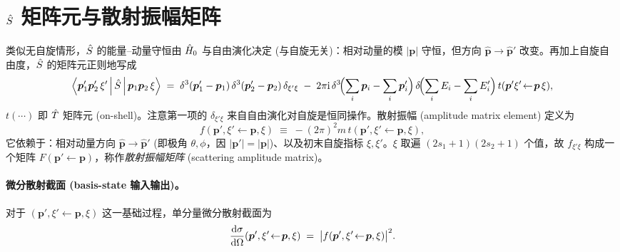 \section{$\hat{S}$ 矩阵元与散射振幅矩阵}\label{sec:Smat-amp-matrix}

类似无自旋情形，$\hat{S}$ 的能量--动量守恒由 $\hat{H}_0$ 与自由演化决定 (与自旋无关)：相对动量的模 $|\bm p|$ 守恒，但方向 $\hat{\bm p}\to\hat{\bm p}'$ 改变。再加上自旋自由度，$\hat{S}$ 的矩阵元正则地写成
\begin{equation}
  \left\langle \bm p_1'\bm p_2'\,\xi' \,\middle|\, \hat{S} \,\middle|\, \bm p_1\bm p_2\,\xi \right\rangle
  \;=\;\delta^3(\bm p_1'-\bm p_1)\,\delta^3(\bm p_2'-\bm p_2)\,\delta_{\xi'\xi}
  \;-\;2\pi\mathrm{i}\,\delta^3\!\Bigl(\sum_i\bm p_i-\sum_i\bm p_i'\Bigr)\,\delta\!\Bigl(\sum_i E_i-\sum_i E_i'\Bigr)\,t(\bm p'\xi'\!\leftarrow\!\bm p\,\xi),
  \label{eq:Smat-element-spin}
\end{equation}
$t(\cdots)$ 即 $\hat{T}$ 矩阵元 (on-shell)。注意第一项的 $\delta_{\xi'\xi}$ 来自自由演化对自旋是恒同操作。散射振幅 (amplitude matrix element) 定义为
\begin{equation}
  f(\bm p',\xi'\!\leftarrow\!\bm p,\xi)
  \;\equiv\;-(2\pi)^2 m\, t(\bm p',\xi'\!\leftarrow\!\bm p,\xi),
  \label{eq:f-from-T}
\end{equation}
它依赖于：相对动量方向 $\hat{\bm p}\to\hat{\bm p}'$ (即极角 $\theta,\phi$，因 $|\bm p'|=|\bm p|$)、以及初末自旋指标 $\xi,\xi'$。$\xi$ 取遍 $(2s_1+1)(2s_2+1)$ 个值，故 $f_{\xi'\xi}$ 构成一个矩阵 $F(\bm p'\!\leftarrow\!\bm p)$，称作\emph{散射振幅矩阵} (scattering amplitude matrix)。

\paragraph{微分散射截面 (basis-state 输入输出)。}对于 $(\bm p',\xi'\!\leftarrow\!\bm p,\xi)$ 这一基础过程，单分量微分散射截面为
\begin{equation}
  \frac{\mathrm{d}\sigma}{\mathrm{d}\Omega}(\bm p',\xi'\!\leftarrow\!\bm p,\xi)
  \;=\;\bigl|f(\bm p',\xi'\!\leftarrow\!\bm p,\xi)\bigr|^2.
  \label{eq:dsigma-basis}
\end{equation}

